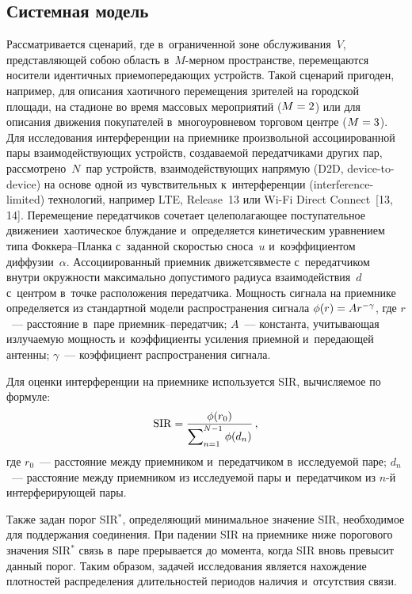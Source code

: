 \begin{multicols}{2}
\vspace*{-6pt}

\section{Системная модель}

  Рассматривается сценарий, где в~ограниченной зоне обслуживания~$V$, 
представляющей собою область в~$M$-мер\-ном пространстве, перемещаются 
носители идентичных прие\-мо\-пе\-ре\-да\-ющих устройств. Такой сценарий 
пригоден, например, для описания хаотичного перемещения зрителей на 
городской площади, на стадионе во время массовых мероприятий ($M\hm=2$) 
или для описания движения покупателей в~многоуровневом торговом центре 
($M\hm=3$). Для исследования интерференции на приемнике произвольной 
ассоциированной пары взаимодействующих устройств, созда\-ва\-емой 
передатчиками других пар, рассмотрено~$N$~пар устройств, 
взаимодействующих напрямую (D2D, device-to-device) на основе одной из 
чувствительных к~интерференции (interference-limited) технологий, например 
LTE, Release~13 или Wi-Fi Direct Connect~[13, 14]. Перемещение передатчиков 
сочетает целеполагающее поступательное движение\linebreak и~хаотическое блуждание
 и~определяется кинетическим уравнением типа Фок\-ке\-ра--План\-ка 
с~заданной ско\-ростью сноса~$u$ и~коэффициентом диф\-фузии~$\alpha$. 
Ассоциированный приемник движется\linebreak вмес\-те с~передатчиком внут\-ри 
окруж\-ности максимально допустимого радиуса взаимодействия~$d$ с~центром 
в~точке расположения передатчика. Мощ\-ность сигнала на приемнике 
определяется из стандартной модели распространения сигнала $\phi(r)\hm= 
Ar^{-\gamma}$, где $r$~--- расстояние в~паре при\-ем\-ник--пе\-ре\-дат\-чик; 
$A$~--- константа, учитывающая излучаемую мощность и~коэффициенты 
усиления приемной и~передающей антенны; $\gamma$~--- коэффициент 
распространения сигнала. 
  
  Для оценки интерференции на приемнике используется SIR, 
вычисляемое по формуле:
  \begin{equation}
  \mathrm{SIR} =\displaystyle\frac{\displaystyle \phi(r_0)\mathstrut}{\displaystyle \sum\nolimits_{n=1}^{N-1} \phi(d_n)\mathstrut}\,,
  \label{e1-gai}
  \end{equation}
где $r_0$~--- расстояние между приемником и~передатчиком в~исследуемой 
паре; $d_n$~--- расстояние между приемником из исследуемой пары 
и~передатчиком из $n$-й интерферирующей пары. 

Также задан порог SIR$^*$, 
определяющий минимальное значение SIR, необходимое для 
поддержания соединения. При падении SIR на приемнике ниже 
порогового значения SIR$^*$ связь в~паре прерывается до момента, когда 
SIR вновь превысит данный порог. 
Таким образом, задачей 
исследования является нахождение плотностей распределения длительностей 
периодов наличия и~отсутствия связи. 


\end{multicols}
